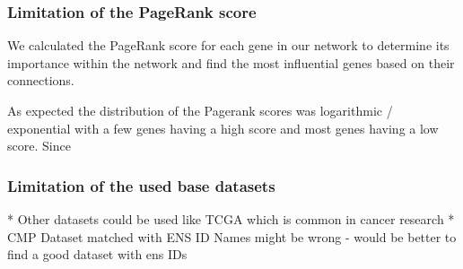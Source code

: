 \subsubsection*{Limitation of the PageRank score} \label{subsubsec:limit_pagerank}
We calculated the PageRank score for each gene in our network to determine its importance within the network
and find the most influential genes based on their connections.

As expected the distribution of the Pagerank scores was logarithmic / exponential with a few genes having a high score and most genes having a low score.
Since







\subsubsection*{Limitation of the used base datasets} \label{subsubsec:limit_base_data}
* Other datasets could be used like TCGA which is common in cancer research
* CMP Dataset matched with ENS ID Names might be wrong - would be better to find a good dataset with ens IDs



